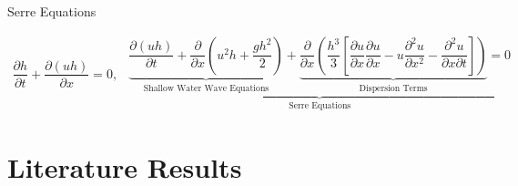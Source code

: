 \documentclass[pdf]{beamer}
\begin{document}
\begin{frame}{Serre Equations}
	
	\begin{subequations}\label{eq:Serre_conservative_form}
		\begin{gather*}
		\dfrac{\partial h}{\partial t} + \dfrac{\partial (uh)}{\partial x} = 0,
		\label{eq:Serre_continuity}
		\end{gather*}
		\begin{gather*}
		\underbrace{\underbrace{\dfrac{\partial (uh)}{\partial t} + \dfrac{\partial}{\partial x} \left ( u^2h + \dfrac{gh^2}{2}\right )}_{\text{Shallow Water Wave Equations}} + \underbrace{\dfrac{\partial}{\partial x} \left (  \dfrac{h^3}{3} \left [ \dfrac{\partial u }{\partial x} \dfrac{\partial u}{\partial x} -u \dfrac{\partial^2 u}{\partial x^2}  - \dfrac{\partial^2 u}{\partial x \partial t}\right ] \right )}_{\text{Dispersion Terms}} = 0}_{\text{Serre Equations}}
		\label{eq:Serre_momentum}
		\end{gather*}
	\end{subequations}
\end{frame}

\section{Literature Results}
\end{document}
